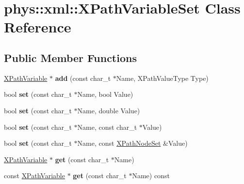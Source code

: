 \hypertarget{classphys_1_1xml_1_1XPathVariableSet}{
\section{phys::xml::XPathVariableSet Class Reference}
\label{df/dd1/classphys_1_1xml_1_1XPathVariableSet}
}
\subsection*{Public Member Functions}
\begin{DoxyCompactItemize}
\item 
\hypertarget{classphys_1_1xml_1_1XPathVariableSet_af498fe5e6ccaedd35be0c9efc9af645e}{
\hyperlink{classphys_1_1xml_1_1XPathVariable}{XPathVariable} $\ast$ {\bfseries add} (const char\_\-t $\ast$Name, XPathValueType Type)}
\label{df/dd1/classphys_1_1xml_1_1XPathVariableSet_af498fe5e6ccaedd35be0c9efc9af645e}

\item 
\hypertarget{classphys_1_1xml_1_1XPathVariableSet_a875931270d5e15a91e4932eb8116063e}{
bool {\bfseries set} (const char\_\-t $\ast$Name, bool Value)}
\label{df/dd1/classphys_1_1xml_1_1XPathVariableSet_a875931270d5e15a91e4932eb8116063e}

\item 
\hypertarget{classphys_1_1xml_1_1XPathVariableSet_a6d0e9cc2f4bd686e7a36c6ecab204a87}{
bool {\bfseries set} (const char\_\-t $\ast$Name, double Value)}
\label{df/dd1/classphys_1_1xml_1_1XPathVariableSet_a6d0e9cc2f4bd686e7a36c6ecab204a87}

\item 
\hypertarget{classphys_1_1xml_1_1XPathVariableSet_aa624806f9744241c28421eb99ca3f376}{
bool {\bfseries set} (const char\_\-t $\ast$Name, const char\_\-t $\ast$Value)}
\label{df/dd1/classphys_1_1xml_1_1XPathVariableSet_aa624806f9744241c28421eb99ca3f376}

\item 
\hypertarget{classphys_1_1xml_1_1XPathVariableSet_a22a89f0771ed80f0423f1ef5ab5699ca}{
bool {\bfseries set} (const char\_\-t $\ast$Name, const \hyperlink{classphys_1_1xml_1_1XPathNodeSet}{XPathNodeSet} \&Value)}
\label{df/dd1/classphys_1_1xml_1_1XPathVariableSet_a22a89f0771ed80f0423f1ef5ab5699ca}

\item 
\hypertarget{classphys_1_1xml_1_1XPathVariableSet_ab84e282b7148b93254b60dc8af3392a9}{
\hyperlink{classphys_1_1xml_1_1XPathVariable}{XPathVariable} $\ast$ {\bfseries get} (const char\_\-t $\ast$Name)}
\label{df/dd1/classphys_1_1xml_1_1XPathVariableSet_ab84e282b7148b93254b60dc8af3392a9}

\item 
\hypertarget{classphys_1_1xml_1_1XPathVariableSet_a08ba31f8616da275915810d876c98324}{
const \hyperlink{classphys_1_1xml_1_1XPathVariable}{XPathVariable} $\ast$ {\bfseries get} (const char\_\-t $\ast$Name) const }
\label{df/dd1/classphys_1_1xml_1_1XPathVariableSet_a08ba31f8616da275915810d876c98324}

\end{DoxyCompactItemize}


